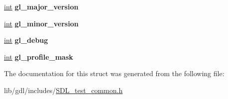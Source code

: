 \begin{DoxyCompactItemize}
\item 
\hypertarget{struct_s_d_l_test___common_state_a766e471516e0a39d0bb8c14ea2042bdf}{}\hyperlink{_s_d_l__thread_8h_a6a64f9be4433e4de6e2f2f548cf3c08e}{int} {\bfseries gl\+\_\+major\+\_\+version}\label{struct_s_d_l_test___common_state_a766e471516e0a39d0bb8c14ea2042bdf}

\item 
\hypertarget{struct_s_d_l_test___common_state_a5a50c65004454c791da21a3473388608}{}\hyperlink{_s_d_l__thread_8h_a6a64f9be4433e4de6e2f2f548cf3c08e}{int} {\bfseries gl\+\_\+minor\+\_\+version}\label{struct_s_d_l_test___common_state_a5a50c65004454c791da21a3473388608}

\item 
\hypertarget{struct_s_d_l_test___common_state_a2710657ef2a0c8aabebc5fceb01c71b5}{}\hyperlink{_s_d_l__thread_8h_a6a64f9be4433e4de6e2f2f548cf3c08e}{int} {\bfseries gl\+\_\+debug}\label{struct_s_d_l_test___common_state_a2710657ef2a0c8aabebc5fceb01c71b5}

\item 
\hypertarget{struct_s_d_l_test___common_state_aa923ff5f227c35523a4e491863a7d907}{}\hyperlink{_s_d_l__thread_8h_a6a64f9be4433e4de6e2f2f548cf3c08e}{int} {\bfseries gl\+\_\+profile\+\_\+mask}\label{struct_s_d_l_test___common_state_aa923ff5f227c35523a4e491863a7d907}

\end{DoxyCompactItemize}


The documentation for this struct was generated from the following file\+:\begin{DoxyCompactItemize}
\item 
lib/gdl/includes/\hyperlink{_s_d_l__test__common_8h}{S\+D\+L\+\_\+test\+\_\+common.\+h}\end{DoxyCompactItemize}
